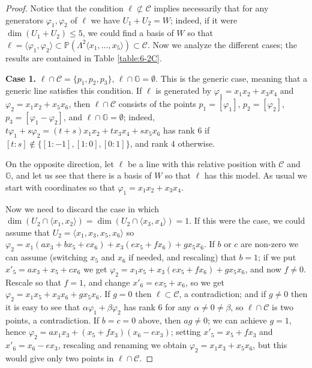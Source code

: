\documentclass[10pt,reqno]{amsart}
\newcommand{\la}{\langle}
\newcommand{\ra}{\rangle}
\newcommand{\cC}{{\mathcal{C}}}
\newcommand{\GG}{\mathbb{G}}
\newcommand{\PP}{\mathbb P}
\renewcommand{\a}{\alpha}
\renewcommand{\b}{\beta}
\newcommand{\f}{\varphi}
\renewcommand{\L}{\Lambda}
\theoremstyle{definition}
\begin{document}
\begin{proof}
Notice that the condition $\ell \not \subset \cC$ implies necessarily that for any generators $\f_1,\f_2$ of $\ell$ we have $U_1+U_2=W$; indeed, if it were $\dim(U_1+U_2)\leq 5$, we could find a basis of $W$ so that $\ell=\la \f_1, \f_2 \ra \subset \PP(\L^2 \la x_1, \dots , x_5 \ra) \subset \cC$.
Now we analyze the different cases; the results are contained in Table \ref{table:6-2C}.

\noindent \textbf{Case 1.} $\ell \cap \cC=\{p_1,p_2,p_3\}$, $\ell \cap \GG=\emptyset$. This is the generic case, meaning that a generic line satisfies this condition. If $\ell$ is generated by $\f_1=x_1x_2+x_3x_4$ and $\f_2=x_1x_2+x_5x_6$, then $\ell \cap \cC$ consists of the points $p_1=[\f_1]$, $p_2=[\f_2]$, $p_3=[\f_1-\f_2]$, and $\ell \cap \GG=\emptyset$; indeed, $t \f_1 +s \f_2=(t+s)x_1x_2+tx_3x_4+sx_5x_6$ has rank $6$ if $[t:s] \notin \{[1:-1],[1:0],[0:1]\}$, and rank $4$ otherwise.

\noindent On the opposite direction, let $\ell$ be a line with this relative position with $\cC$ and $\GG$, and let us see that there is a basis of $W$ so that $\ell$ has this model. As usual we start with coordinates so that $\f_1=x_1x_2+x_3x_4$. 

\noindent Now we need to discard the case in which $\dim(U_2 \cap \la x_1,x_2 \ra)=\dim(U_2\cap\la x_3,x_4\ra)=1$. If this were the case, we could assume that $U_2=\la x_1,x_3,x_5,x_6 \ra$ so $\f_2=x_1(ax_3+bx_5+cx_6)+x_3(ex_5+fx_6)+gx_5x_6$. If $b$ or $c$ are non-zero we can assume (switching $x_5$ and $x_6$ if needed, and rescaling) that $b=1$; if we put $x'_5=ax_3+x_5+cx_6$ we get $\f_2=x_1x_5+x_3(ex_5+fx_6)+gx_5x_6$, and now $f \ne 0$. Rescale so that $f=1$, and change $x'_6=ex_5+x_6$, so we get $\f_2=x_1x_5+x_3x_6+gx_5x_6$. If $g=0$ then $\ell \subset \cC$, a contradiction; and if $g \ne 0$ then it is easy to see that $\a \f_1 + \b \f_2$ has rank $6$ for any $\a \ne 0 \ne \b$, so $\ell \cap \cC$ is two points, a contradiction. If $b=c=0$ above, then $ag\neq 0$; we can achieve $g=1$, hence $\f_2=ax_1x_3+(x_5+fx_3)(x_6-ex_3)$; setting $x'_5=x_5+fx_3$ and $x'_6=x_6-ex_3$, rescaling and renaming we obtain $\f_2=x_1x_3+x_5x_6$, but this would give only two points in $\ell\cap\cC$.


\end{proof}
\end{document}
